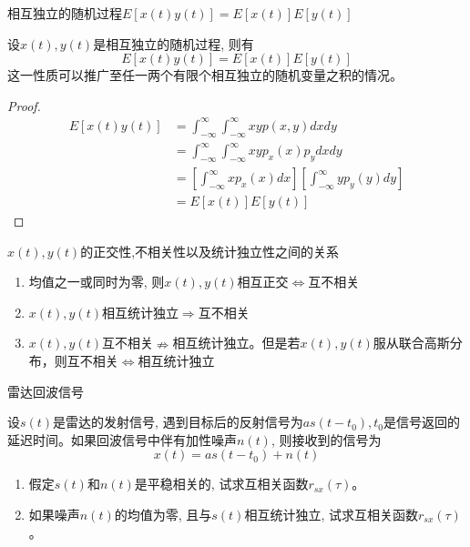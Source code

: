 \begin{frame}{相互独立的随机过程$E[x(t)y(t)]=E[x(t)]E[y(t)]$}
\begin{block}{}
	设$x(t), y(t)$是相互独立的随机过程, 则有
	\[ E[x(t)y(t)]=E[x(t)]E[y(t)]\]
	这一性质可以推广至任一两个有限个相互独立的随机变量之积的情况。
\end{block}
\begin{proof}
	\begin{align*}
	E[x(t)y(t)]&=\int_{-\infty}^{\infty}\int_{-\infty}^{\infty}xyp(x,y)dxdy\\
	&=\int_{-\infty}^{\infty}\int_{-\infty}^{\infty}xyp_x(x)p_ydxdy\\
	&=\left[\int_{-\infty}^{\infty}xp_x(x)dx\right]\left[\int_{-\infty}^{\infty}yp_y(y)dy\right]\\
	&=E[x(t)]E[y(t)]
	\end{align*}
\end{proof}
\end{frame}

\begin{frame}{$x(t),y(t)$的正交性,不相关性以及统计独立性之间的关系}
\begin{enumerate}
	\item 均值之一或同时为零, 则$x(t), y(t)$相互正交$\Leftrightarrow$互不相关\\
	\item $x(t), y(t)$相互统计独立$\Rightarrow$互不相关
	\item $x(t), y(t)$互不相关$\nRightarrow$相互统计独立。但是若$x(t), y(t)$服从联合高斯分布，则互不相关$\Leftrightarrow$相互统计独立
\end{enumerate}
\end{frame}

\begin{frame}{雷达回波信号}
\begin{example}
	设$s(t)$是雷达的发射信号, 遇到目标后的反射信号为$as(t-t_0), t_0$是信号返回的延迟时间。如果回波信号中伴有加性噪声$n(t)$, 则接收到的信号为
	\[x(t)=as(t-t_0)+n(t) \]
	\begin{enumerate}
		\item 假定$s(t)$和$n(t)$是平稳相关的, 试求互相关函数$r_{sx}(\tau)$。
		\item 如果噪声$n(t)$的均值为零, 且与$s(t)$相互统计独立, 试求互相关函数$r_{sx}(\tau)$。
	\end{enumerate}
\end{example}
\end{frame}

